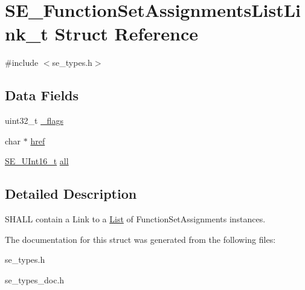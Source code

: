 \hypertarget{structSE__FunctionSetAssignmentsListLink__t}{}\section{S\+E\+\_\+\+Function\+Set\+Assignments\+List\+Link\+\_\+t Struct Reference}
\label{structSE__FunctionSetAssignmentsListLink__t}


{\ttfamily \#include $<$se\+\_\+types.\+h$>$}

\subsection*{Data Fields}
\begin{DoxyCompactItemize}
\item 
uint32\+\_\+t \hyperlink{group__FunctionSetAssignmentsListLink_ga83c38e7f0cf85bdeca600fa281b2e9b6}{\+\_\+flags}
\item 
char $\ast$ \hyperlink{group__FunctionSetAssignmentsListLink_ga3036f6fd9dadbff2ae4835682285dc6d}{href}
\item 
\hyperlink{group__UInt16_gac68d541f189538bfd30cfaa712d20d29}{S\+E\+\_\+\+U\+Int16\+\_\+t} \hyperlink{group__FunctionSetAssignmentsListLink_ga1d29d4204c052e0aef55b98d374fc408}{all}
\end{DoxyCompactItemize}


\subsection{Detailed Description}
S\+H\+A\+LL contain a Link to a \hyperlink{structList}{List} of Function\+Set\+Assignments instances. 

The documentation for this struct was generated from the following files\+:\begin{DoxyCompactItemize}
\item 
se\+\_\+types.\+h\item 
se\+\_\+types\+\_\+doc.\+h\end{DoxyCompactItemize}

